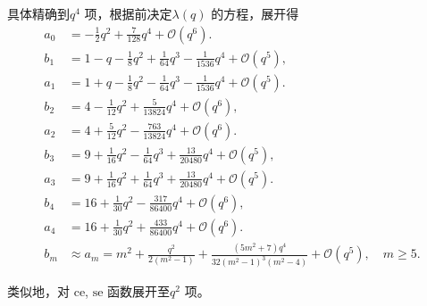具体精确到\(q^4\) 项，根据前决定\(\lambda(q)\) 的方程，展开得
\begin{align*}
	a_0 & = -\frac{1}{2}q^2 + \frac{7}{128}q^4 + \mathcal{O}(q^6).                                                                      \\
	b_1 & = 1 - q - \frac{1}{8}q^2 + \frac{1}{64}q^3 - \frac{1}{1536}q^4 + \mathcal{O}(q^5),                                            \\
	a_1 & = 1 + q - \frac{1}{8}q^2 - \frac{1}{64}q^3 - \frac{1}{1536}q^4 + \mathcal{O}(q^5).                                            \\
	b_2 & = 4 - \frac{1}{12}q^2 + \frac{5}{13824}q^4 + \mathcal{O}(q^6),                                                                \\
	a_2 & = 4 + \frac{5}{12}q^2 - \frac{763}{13824}q^4 + \mathcal{O}(q^6).                                                              \\
	b_3 & = 9 + \frac{1}{16}q^2 - \frac{1}{64}q^3 + \frac{13}{20480}q^4 + \mathcal{O}(q^5),                                             \\
	a_3 & = 9 + \frac{1}{16}q^2 + \frac{1}{64}q^3 + \frac{13}{20480}q^4 + \mathcal{O}(q^5).                                             \\
	b_4 & = 16 + \frac{1}{30}q^2 - \frac{317}{86400}q^4 + \mathcal{O}(q^6),                                                             \\
	a_4 & = 16 + \frac{1}{30}q^2 + \frac{433}{86400}q^4 + \mathcal{O}(q^6).                                                             \\
	b_m & \approx a_m = m^2 + \frac{q^2}{2(m^2 - 1)} + \frac{(5m^2 + 7)q^4}{32(m^2 - 1)^3(m^2 - 4)} + \mathcal{O}(q^5), \quad m \geq 5.
\end{align*}

类似地，对 \(\mathrm{ce}\), \(\mathrm{se}\) 函数展开至\(q^2\) 项。

